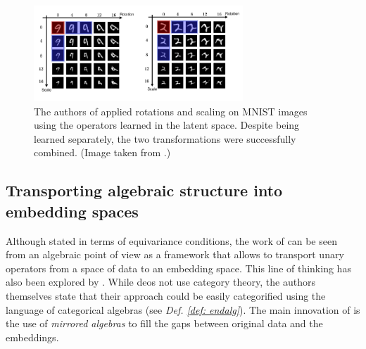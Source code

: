 \documentclass[11pt,a4paper,openright,twoside]{report}
\theoremstyle{plain}
\theoremstyle{definition}
\begin{document}
\begin{figure}[h]
  \begin{center}
    \includegraphics[width=0.7\textwidth]{figures/rotations_and_scaling.png}     
    \caption[Classifier]{The authors of \cite{chytas2024poolingimagedatasetsmultiple} applied rotations and scaling on MNIST images using the operators learned in the latent space. Despite being learned separately, the two transformations were successfully combined. (Image taken from \cite{chytas2024poolingimagedatasetsmultiple}.)}
    \label{fig: rotationsscaling}
  \end{center}
\end{figure}

\subsection{Transporting algebraic structure into embedding spaces}

Although stated in terms of equivariance conditions, the work of \cite{chytas2024poolingimagedatasetsmultiple} can be seen from an algebraic point of view as a framework that allows to transport unary operators from a space of data to an embedding space. This line of thinking has also been explored by \cite{pfrommer2024transport}. While \cite{pfrommer2024transport} deos not use category theory, the authors themselves state that their approach could be easily categorified using the language of categorical algebras (see \textit{Def. \ref{def: endalg}}). The main innovation of \cite{pfrommer2024transport} is the use of \textit{mirrored algebras} to fill the gaps between original data and the embeddings.
\end{document}
